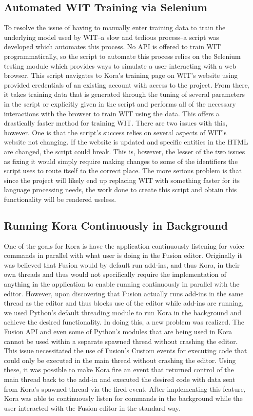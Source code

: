 \documentclass[onecolumn, draftclsnofoot,10pt, compsoc]{IEEEtran}
\begin{document}
	\subsection{Automated WIT Training via Selenium}
		To resolve the issue of having to manually enter training data to train the underlying model used by WIT--a slow and tedious process--a script was developed which automates this process.
		No API is offered to train WIT programmatically, so the script to automate this process relies on the Selenium testing module which provides ways to simulate a user interacting with a web browser.
		This script navigates to Kora's training page on WIT's website using provided credentials of an existing account with access to the project.
		From there, it takes training data that is generated through the tuning of several parameters in the script or explicitly given in the script and performs all of the necessary interactions with the browser to train WIT using the data.
		This offers a drastically faster method for training WIT.
		There are two issues with this, however.
		One is that the script's success relies on several aspects of WIT's website not changing.
		If the website is updated and specific entities in the HTML are changed, the script could break.
		This is, however, the lesser of the two issues as fixing it would simply require making changes to some of the identifiers the script uses to route itself to the correct place.
		The more serious problem is that since the project will likely end up replacing WIT with something faster for its language processing needs, the work done to create this script and obtain this functionality will be rendered useless.

	\subsection{Running Kora Continuously in Background}
		One of the goals for Kora is have the application continuously listening for voice commands in parallel with what user is doing in the Fusion editor.
		Originally it was believed that Fusion would by default run add-ins, and thus Kora, in their own threads and thus would not specifically require the implementation of anything in the application to enable running continuously in parallel with the editor.
		However, upon discovering that Fusion actually runs add-ins in the same thread as the editor and thus blocks use of the editor while add-ins are running, we used Python's default threading module to run Kora in the background and achieve the desired functionality.
		In doing this, a new problem was realized.
		The Fusion API and even some of Python's modules that are being used in Kora cannot be used within a separate spawned thread without crashing the editor.
		This issue necessitated the use of Fusion's Custom events for executing code that could only be executed in the main thread without crashing the editor.
		Using these, it was possible to make Kora fire an event that returned control of the main thread back to the add-in and executed the desired code with data sent from Kora's spawned thread via the fired event.
		After implementing this feature, Kora was able to continuously listen for commands in the background while the user interacted with the Fusion editor in the standard way.
\end{document}
